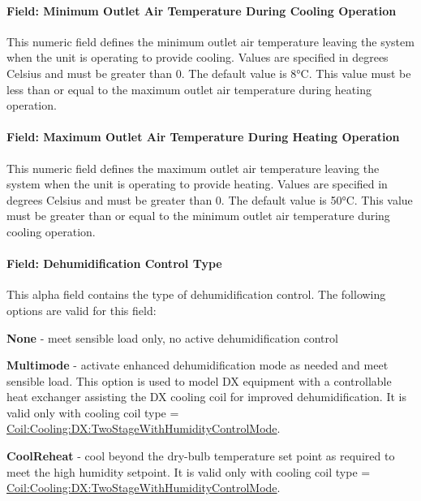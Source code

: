 \paragraph{Field: Minimum Outlet Air Temperature During Cooling Operation}\label{field-minimum-outlet-air-temperature-during-cooling-operation}

This numeric field defines the minimum outlet air temperature leaving the system when the unit is operating to provide cooling. Values are specified in degrees Celsius and must be greater than 0. The default value is 8°C. This value must be less than or equal to the maximum outlet air temperature during heating operation.

\paragraph{Field: Maximum Outlet Air Temperature During Heating Operation}\label{field-maximum-outlet-air-temperature-during-heating-operation}

This numeric field defines the maximum outlet air temperature leaving the system when the unit is operating to provide heating. Values are specified in degrees Celsius and must be greater than 0. The default value is 50°C. This value must be greater than or equal to the minimum outlet air temperature during cooling operation.

\paragraph{Field: Dehumidification Control Type}\label{field-dehumidification-control-type-5-000}

This alpha field contains the type of dehumidification control. The following options are valid for this field:

\textbf{None} - meet sensible load only, no active dehumidification control

\textbf{Multimode} - activate enhanced dehumidification mode as needed and meet sensible load. This option is used to model DX equipment with a controllable heat exchanger assisting the DX cooling coil for improved dehumidification. It is valid only with cooling coil type = \hyperref[coilcoolingdxtwostagewithhumiditycontrolmode]{Coil:Cooling:DX:TwoStageWithHumidityControlMode}.

\textbf{CoolReheat} - cool beyond the dry-bulb temperature set point as required to meet the high humidity setpoint. It is valid only with cooling coil type = \hyperref[coilcoolingdxtwostagewithhumiditycontrolmode]{Coil:Cooling:DX:TwoStageWithHumidityControlMode}.

